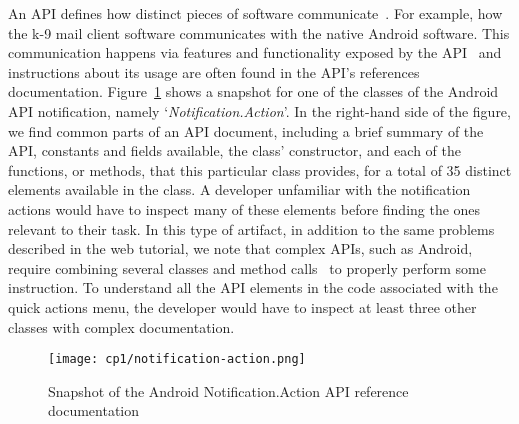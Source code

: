 An \acf{API} defines how  distinct pieces of software communicate~\cite{robillard2011field}.
For example, how the k-9 mail client software communicates 
with the native Android software. This communication happens via features and functionality exposed by the API~\cite{Robillard2015} 
and instructions about its usage are often found in the API's references documentation.
Figure~\ref{fig:android-notification-action} shows a snapshot for one of the classes of the Android API notification, namely `\textit{Notification.Action}'. 
In the right-hand side of the figure, we find common parts of an
API document, including a brief summary of the API,
constants and fields available, the class' constructor, and 
each of the functions, or methods, that this particular class provides,  
for a total of 35 distinct elements available in the class.
A developer unfamiliar with the notification actions would have to 
inspect many of these elements before finding the ones relevant to
their task. In this type of artifact, in addition to the same problems described in the web tutorial,
we note that complex APIs, 
such as Android, require combining several classes
and method calls~\cite{robillard2011field} to properly perform some instruction.
To understand all the API elements in the code associated with the quick actions menu,
the developer would have to inspect at least three other classes 
with complex documentation.





\begin{figure}
    \centering
    \texttt{[image: cp1/notification-action.png]}
    \caption{Snapshot of the Android Notification.Action API reference documentation}
    \label{fig:android-notification-action}
\end{figure}




